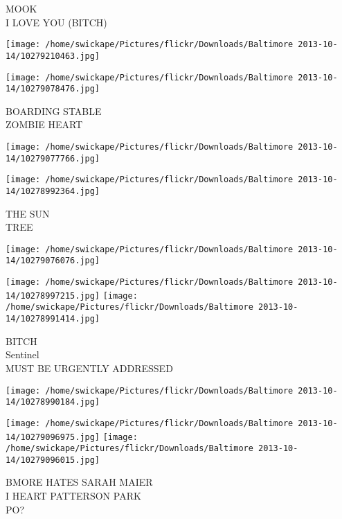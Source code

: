 \documentclass[10pt,letterpaper]{article}
\begin{document}
MOOK\\
I LOVE YOU (BITCH)\\
\pagebreak

\texttt{[image: /home/swickape/Pictures/flickr/Downloads/Baltimore 2013-10-14/10279210463.jpg]}

\vspace{0.25in}
\texttt{[image: /home/swickape/Pictures/flickr/Downloads/Baltimore 2013-10-14/10279078476.jpg]}

BOARDING STABLE\\
ZOMBIE HEART\\
\pagebreak

\texttt{[image: /home/swickape/Pictures/flickr/Downloads/Baltimore 2013-10-14/10279077766.jpg]}

\vspace{0.25in}
\texttt{[image: /home/swickape/Pictures/flickr/Downloads/Baltimore 2013-10-14/10278992364.jpg]}

THE SUN\\
TREE\\
\pagebreak

\texttt{[image: /home/swickape/Pictures/flickr/Downloads/Baltimore 2013-10-14/10279076076.jpg]}

\vspace{0.25in}
\texttt{[image: /home/swickape/Pictures/flickr/Downloads/Baltimore 2013-10-14/10278997215.jpg]}
\texttt{[image: /home/swickape/Pictures/flickr/Downloads/Baltimore 2013-10-14/10278991414.jpg]}

BITCH\\
Sentinel\\
MUST BE URGENTLY ADDRESSED\\
\pagebreak

\texttt{[image: /home/swickape/Pictures/flickr/Downloads/Baltimore 2013-10-14/10278990184.jpg]}

\vspace{0.25in}
\texttt{[image: /home/swickape/Pictures/flickr/Downloads/Baltimore 2013-10-14/10279096975.jpg]}
\texttt{[image: /home/swickape/Pictures/flickr/Downloads/Baltimore 2013-10-14/10279096015.jpg]}

BMORE HATES SARAH MAIER\\
I HEART PATTERSON PARK\\
PO?\\
\pagebreak
\end{document}
